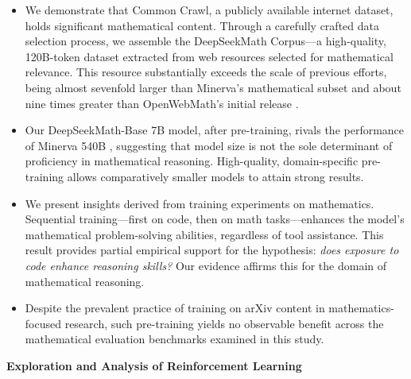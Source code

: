 \begin{itemize}[topsep=0pt]
    \item We demonstrate that Common Crawl, a publicly available internet dataset, holds significant mathematical content. Through a carefully crafted data selection process, we assemble the DeepSeekMath Corpus—a high-quality, 120B-token dataset extracted from web resources selected for mathematical relevance. This resource substantially exceeds the scale of previous efforts, being almost sevenfold larger than Minerva’s mathematical subset \citep{minerva} and about nine times greater than OpenWebMath’s initial release \citep{openwebmath}.

    \item Our DeepSeekMath-Base 7B model, after pre-training, rivals the performance of Minerva 540B \citep{minerva}, suggesting that model size is not the sole determinant of proficiency in mathematical reasoning. High-quality, domain-specific pre-training allows comparatively smaller models to attain strong results.

    \item We present insights derived from training experiments on mathematics. Sequential training—first on code, then on math tasks—enhances the model’s mathematical problem-solving abilities, regardless of tool assistance. This result provides partial empirical support for the hypothesis: \textit{does exposure to code enhance reasoning skills?} Our evidence affirms this for the domain of mathematical reasoning.

    \item Despite the prevalent practice of training on arXiv content in mathematics-focused research, such pre-training yields no observable benefit across the mathematical evaluation benchmarks examined in this study.
\end{itemize}

\textbf{Exploration and Analysis of Reinforcement Learning}

